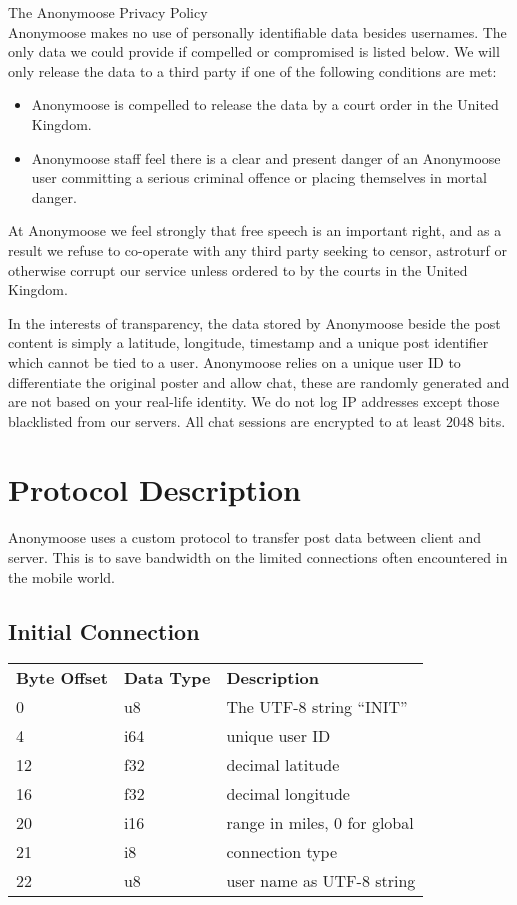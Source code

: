 \documentclass[12pt, a4paper]{article}
\begin{document}
The Anonymoose Privacy Policy\\

Anonymoose makes no use of personally identifiable data besides usernames. The only data we could provide if compelled or compromised is listed below. We will only release the data to a third party if one of the following conditions are met:
\begin{itemize}
\item Anonymoose is compelled to release the data by a court order in the United Kingdom.
\item Anonymoose staff feel there is a clear and present danger of an Anonymoose user committing a serious criminal offence or placing themselves in mortal danger.
\end{itemize}

At Anonymoose we feel strongly that free speech is an important right, and as a result we refuse to co-operate with any third party seeking to censor, astroturf or otherwise corrupt our service unless ordered to by the courts in the United Kingdom.

In the interests of transparency, the data stored by Anonymoose beside the post content is simply a latitude, longitude, timestamp and a unique post identifier which cannot be tied to a user. Anonymoose relies on a unique user ID to differentiate the original poster and allow chat, these are randomly generated and are not based on your real-life identity. We do not log IP addresses except those blacklisted from our servers. All chat sessions are encrypted to at least 2048 bits.


\clearpage
\section{Protocol Description}
Anonymoose uses a custom protocol to transfer post data between client and server. This is to save bandwidth on the limited connections often encountered in the mobile world.
\subsection{Initial Connection}
\begin{table}[h]
\centering
\begin{tabular}{lll}
\textbf{Byte Offset} & \textbf{Data Type} &\textbf{Description}\\
0 & u8 & The UTF-8 string ``INIT''\\
4 & i64 & unique user ID\\
12 & f32 & decimal latitude\\
16 & f32 & decimal longitude\\
20 & i16 & range in miles, 0 for global\\
21 & i8 & connection type\\
22 & u8 & user name as UTF-8 string\\
\end{tabular}
\end{table}
\end{document}
